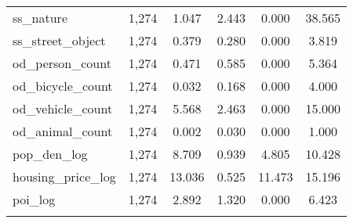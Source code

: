 \begin{table}[!htbp]
\begin{tabular}{@{\extracolsep{5pt}}lccccc}
ss\_nature & 1,274 & 1.047 & 2.443 & 0.000 & 38.565 \\ 
ss\_street\_object & 1,274 & 0.379 & 0.280 & 0.000 & 3.819 \\ 
od\_person\_count & 1,274 & 0.471 & 0.585 & 0.000 & 5.364 \\ 
od\_bicycle\_count & 1,274 & 0.032 & 0.168 & 0.000 & 4.000 \\ 
od\_vehicle\_count & 1,274 & 5.568 & 2.463 & 0.000 & 15.000 \\ 
od\_animal\_count & 1,274 & 0.002 & 0.030 & 0.000 & 1.000 \\ 
pop\_den\_log & 1,274 & 8.709 & 0.939 & 4.805 & 10.428 \\ 
housing\_price\_log & 1,274 & 13.036 & 0.525 & 11.473 & 15.196 \\ 
poi\_log & 1,274 & 2.892 & 1.320 & 0.000 & 6.423 \\ 
\hline \\[-1.8ex] 
\end{tabular} 
\end{table} 
